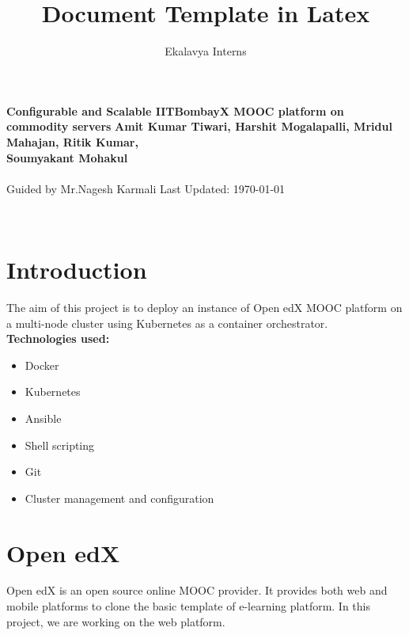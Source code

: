 \documentclass[12pt]{article}
\title{Document Template in Latex}
\author{Ekalavya Interns}
\begin{document}
\begin{titlepage}
 \begin{center}
\Huge
\textbf{Configurable and Scalable IITBombayX MOOC platform on commodity servers} 
\vfill
\LARGE
\textbf{Amit Kumar Tiwari, Harshit Mogalapalli, Mridul Mahajan, Ritik Kumar,\\ Soumyakant Mohakul\\}
\textbf{\\}
Guided by Mr.Nagesh Karmali
\vfill
\Large
Last Updated: \today
\end{center}
\end{titlepage}

 \pagebreak \textcolor{white}{text} \pagebreak
\thispagestyle{empty}

\pagebreak
\setcounter{page}{1}

\listoffigures

\pagebreak


\tableofcontents

\pagebreak

\setcounter{page}{1}

\section{Introduction}

The aim of this project is to deploy an instance of Open edX MOOC platform on a multi-node cluster using Kubernetes as a container orchestrator. \\

\textbf{Technologies used:}
\begin{itemize}
	\item Docker
	\item Kubernetes
	\item Ansible
	\item Shell scripting
	\item Git
	\item Cluster management and configuration
\end{itemize}



\section{Open edX}
Open edX is an open source online MOOC provider. It provides both web and mobile platforms to clone the basic template of e-learning platform. In this project, we are working on the web platform.
\end{document}
